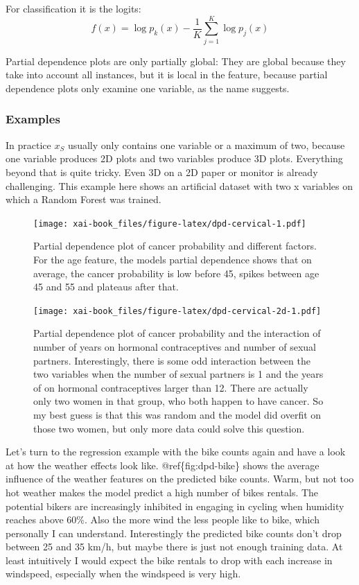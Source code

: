 \documentclass[12pt,]{krantz}
\theoremstyle{definition}
\theoremstyle{definition}
\theoremstyle{definition}
\theoremstyle{remark}
\begin{document}
For classification it is the logits:
\[ f(x) = \log p_k(x) - \frac{1}{K} \sum_{j=1}^K \log p_j(x) \]

Partial dependence plots are only partially global: They are global
because they take into account all instances, but it is local in the
feature, because partial dependence plots only examine one variable, as
the name suggests.

\subsubsection{Examples}\label{examples}

In practice \(x_S\) usually only contains one variable or a maximum of
two, because one variable produces 2D plots and two variables produce 3D
plots. Everything beyond that is quite tricky. Even 3D on a 2D paper or
monitor is already challenging. This example here shows an artificial
dataset with two x variables on which a Random Forest was trained.

\begin{figure}
\centering
\texttt{[image: xai-book\_files/figure-latex/dpd-cervical-1.pdf]}
\caption{\label{fig:dpd-cervical}Partial dependence plot of cancer
probability and different factors. For the age feature, the models
partial dependence shows that on average, the cancer probability is low
before 45, spikes between age 45 and 55 and plateaus after that.}
\end{figure}

\begin{figure}
\centering
\texttt{[image: xai-book\_files/figure-latex/dpd-cervical-2d-1.pdf]}
\caption{\label{fig:dpd-cervical-2d}Partial dependence plot of cancer
probability and the interaction of number of years on hormonal
contraceptives and number of sexual partners. Interestingly, there is
some odd interaction between the two variables when the number of sexual
partners is 1 and the years of on hormonal contraceptives larger than
12. There are actually only two women in that group, who both happen to
have cancer. So my best guess is that this was random and the model did
overfit on those two women, but only more data could solve this
question.}
\end{figure}

Let's turn to the regression example with the bike counts again and have
a look at how the weather effects look like. @ref\{fig:dpd-bike\} shows
the average influence of the weather features on the predicted bike
counts. Warm, but not too hot weather makes the model predict a high
number of bikes rentals. The potential bikers are increasingly inhibited
in engaging in cycling when humidity reaches above 60\%. Also the more
wind the less people like to bike, which personally I can understand.
Interestingly the predicted bike counts don't drop between 25 and 35
km/h, but maybe there is just not enough training data. At least
intuitively I would expect the bike rentals to drop with each increase
in windspeed, especially when the windspeed is very high.
\end{document}
